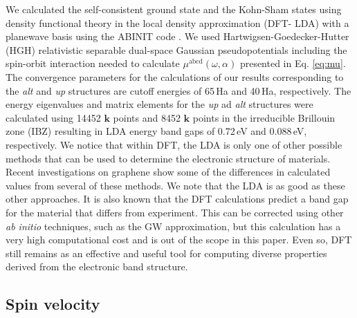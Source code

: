 \documentclass[prb,11pt,tightenlines,twocolumn,aps]{revtex4-1}
\begin{document}
{\color{red} We calculated the self-consistent ground state and the Kohn-Sham
states using density functional theory in the local density approximation (DFT-
LDA) with a planewave basis using the ABINIT code \cite{gonzeCPC09}.}
% 
We used Hartwigsen-Goedecker-Hutter (HGH) relativistic separable dual-space
Gaussian pseudopotentials \cite{hartwigsenPRB98} including the spin-orbit
interaction needed to calculate $\mu^{\mathrm{abcd}}(\omega,\alpha)$ presented
in Eq.
\eqref{eq:mu}.
% 
The convergence parameters for the calculations of our results corresponding to
the \emph{alt} and \emph{up} structures are cutoff energies of 65\,Ha and
40\,Ha, respectively. The energy eigenvalues and matrix elements for the
\emph{up} ad \emph{alt} structures were calculated using 14452 $\mathbf{k}$
points and 8452 $\mathbf{k}$ points in the irreducible Brillouin zone (IBZ)
{\color{red} resulting in LDA energy band gaps of 0.72\,eV and 0.088\,eV,
respectively.
% 
We notice that within DFT, the LDA is only one of other possible methods that
can be used to determine the electronic structure of materials. Recent
investigations on graphene show some of the differences in calculated values
from several of these methods\cite{karamanisJPCC15,botelloACR14}. We note that
the LDA is as good as these other approaches. It is also known that the DFT
calculations predict a band gap for the material that differs from experiment.
This can be corrected using other \emph{ab initio} techniques, such as the GW
approximation\cite{onidaRMP02}, but this calculation has a very high
computational cost and is out of the scope in this paper. Even so, DFT still
remains as an effective and useful tool for computing diverse properties
derived from the electronic band structure.}


\subsection{Spin velocity} %
\label{sec:res-spin_velocity}
\end{document}
